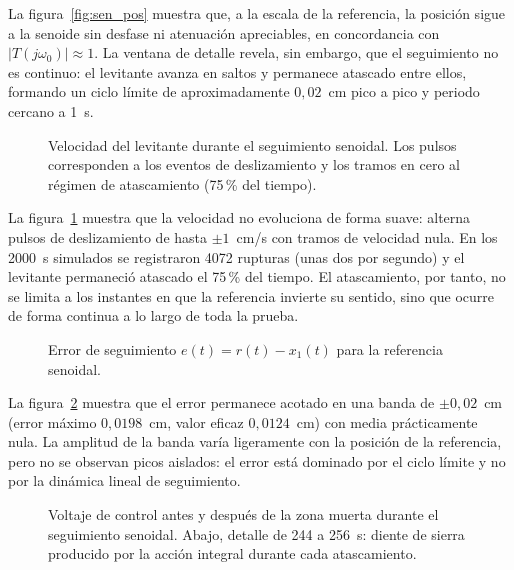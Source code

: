 La figura~\ref{fig:sen_pos} muestra que, a la escala de la referencia, la posición sigue a la senoide sin desfase ni atenuación apreciables, en concordancia con $|T(j\omega_0)|\approx 1$. La ventana de detalle revela, sin embargo, que el seguimiento no es continuo: el levitante avanza en saltos y permanece atascado entre ellos, formando un ciclo límite de aproximadamente $0{,}02$~cm pico a pico y periodo cercano a 1~s.

\FloatBarrier

\begin{figure}[ht]
    \centering
    
    \caption[Seguimiento senoidal: velocidad]{Velocidad del levitante durante el seguimiento senoidal. Los pulsos corresponden a los eventos de deslizamiento y los tramos en cero al régimen de atascamiento (75\,\% del tiempo).}
    \label{fig:sen_vel}
\end{figure}

La figura~\ref{fig:sen_vel} muestra que la velocidad no evoluciona de forma suave: alterna pulsos de deslizamiento de hasta $\pm 1$~cm/s con tramos de velocidad nula. En los 2000~s simulados se registraron 4072 rupturas (unas dos por segundo) y el levitante permaneció atascado el 75\,\% del tiempo. El atascamiento, por tanto, no se limita a los instantes en que la referencia invierte su sentido, sino que ocurre de forma continua a lo largo de toda la prueba.

\FloatBarrier

\begin{figure}[ht]
    \centering
    
    \caption[Seguimiento senoidal: error]{Error de seguimiento $e(t)=r(t)-x_1(t)$ para la referencia senoidal.}
    \label{fig:sen_error}
\end{figure}

La figura~\ref{fig:sen_error} muestra que el error permanece acotado en una banda de $\pm 0{,}02$~cm (error máximo $0{,}0198$~cm, valor eficaz $0{,}0124$~cm) con media prácticamente nula. La amplitud de la banda varía ligeramente con la posición de la referencia, pero no se observan picos aislados: el error está dominado por el ciclo límite y no por la dinámica lineal de seguimiento.

\FloatBarrier

\begin{figure}[ht]
    \centering
    
    \caption[Seguimiento senoidal: señal de control]{Voltaje de control antes y después de la zona muerta durante el seguimiento senoidal. Abajo, detalle de 244 a 256~s: diente de sierra producido por la acción integral durante cada atascamiento.}
    \label{fig:sen_ctrl}
\end{figure}

